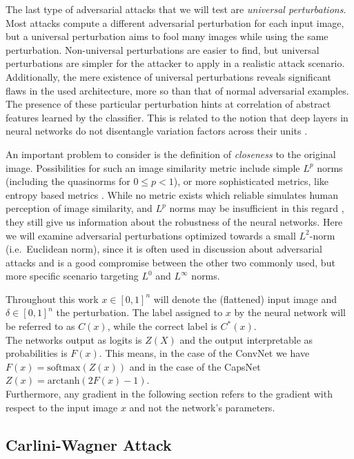 The last type of adversarial attacks that we will test are \emph{universal perturbations}.
Most attacks compute a different adversarial perturbation for each input image, but a universal perturbation aims to fool many images while using the same perturbation.
Non-universal perturbations are easier to find, but universal perturbations are simpler for the attacker to apply in a realistic attack scenario.
Additionally, the mere existence of universal perturbations reveals significant flaws in the used architecture, more so than that of normal adversarial examples.
The presence of these particular perturbation hints at correlation of abstract features learned by the classifier.
This is related to the notion that deep layers in neural networks do not disentangle variation factors across their units \citep{intriguing}.

An important problem to consider is the definition of \emph{closeness} to the original image. Possibilities for such an image similarity metric include simple $L^p$ norms (including the quasinorms for $0 \leq p < 1$),
or more sophisticated metrics, like entropy based metrics \citep{umbrella}.
While no metric exists which reliable simulates human perception of image similarity, and $L^p$ norms may be insufficient in this regard \citep{lpnorms}, they still give us information about the robustness of the neural networks.
Here we will examine adversarial perturbations optimized towards a small $L^2$-norm (i.e.\ Euclidean norm), since it is often used in discussion about adversarial attacks and is a good compromise between the other two commonly used, but more specific scenario targeting $L^0$ and $L^\infty$ norms.

Throughout this work $x \in [0,1]^n$ will denote the (flattened) input image and $\delta \in [0,1]^n$ the perturbation.
The label assigned to $x$ by the neural network will be referred to as $C(x)$, while the correct label is $C^*(x)$.\\
The networks output as logits is $Z(X)$ and the output interpretable as probabilities is $F(x)$.
This means, in the case of the ConvNet we have $F(x) = \mathrm{softmax}(Z(x))$ and in the case of the CapsNet $Z(x) = \mathrm{arctanh}(2F(x) - 1)$. \\
Furthermore, any gradient in the following section refers to the gradient with respect to the input image $x$ and not the network's parameters.

\subsection{Carlini-Wagner Attack}

